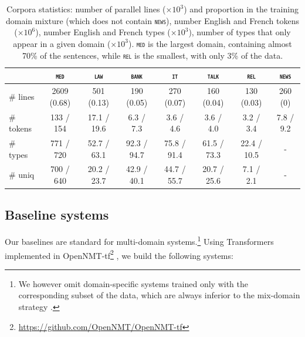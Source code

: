 \documentclass[11pt]{article}
\newcommand{\domain}[1]{\texttt{\textsc{#1}}}
\begin{document}
\begin{table}[htbp]
  \centering
  \begin{tabular}{|l|ccccccc|} %
    \cline{2-8} 
    \multicolumn{1}{c|}{} & \multicolumn{1}{c}{\domain{med}} & \multicolumn{1}{c}{\domain{law}} & \multicolumn{1}{c}{\domain{bank}} & \multicolumn{1}{c}{\domain{it}} & \multicolumn{1}{c}{\domain{talk}} & \multicolumn{1}{c}{\domain{rel}} & \multicolumn{1}{c|}{\domain{news}} \\
    \hline 
    \# lines & 2609 (0.68) & 501 (0.13) & 190 (0.05) & 270 (0.07) & 160 (0.04) & 130 (0.03) & 260 (0) \\
    \# tokens &  133 / 154  &  17.1 / 19.6 &  6.3 / 7.3 &  3.6 / 4.6 &  3.6 / 4.0 &  3.2 / 3.4 & 7.8 / 9.2   \\
    \# types & 771 / 720 & 52.7 / 63.1 & 92.3 / 94.7 & 75.8 / 91.4 & 61.5 / 73.3 & 22.4 / 10.5 & - \\
    \# uniq & 700 / 640 & 20.2 / 23.7 & 42.9 / 40.1 & 44.7 / 55.7 & 20.7 / 25.6 & 7.1 / 2.1 & - \\
    \hline
  \end{tabular}
  \caption{Corpora statistics: number of parallel lines ($\times 10^3$) and proportion in the training domain mixture (which does not contain \domain{news}), number English and French tokens ($\times 10^6$), number English and French types ($\times 10^3$), number of types that only appear in a given domain ($\times 10^3$). \domain{med} is the largest domain, containing almost 70\% of the sentences, while \domain{rel} is the smallest, with only 3\% of the data.
  }
\label{tab:Corpora}
\end{table}

\subsection{Baseline systems \label{ssec:baseline}}
Our baselines are standard for multi-domain systems.\footnote{We however omit domain-specific systems trained only with the corresponding subset of the data, which are always inferior to the mix-domain strategy \cite{Britz17mixing}.} Using Transformers \cite{Vaswani17attention} implemented in OpenNMT-tf\footnote{\url{https://github.com/OpenNMT/OpenNMT-tf}} \cite{Klein17opennmt}, we build the following systems:
\end{document}
